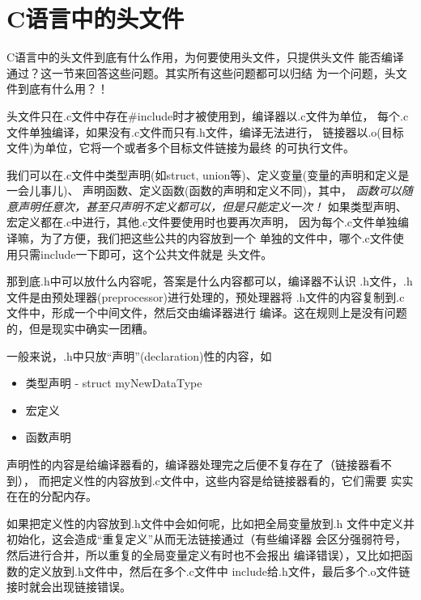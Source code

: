 \section[header file in pure C]{C语言中的头文件}
C语言中的头文件到底有什么作用，为何要使用头文件，只提供头文件
能否编译通过？这一节来回答这些问题。其实所有这些问题都可以归结
为一个问题，头文件到底有什么用？！

头文件只在.c文件中存在\#include时才被使用到，编译器以.c文件为单位，
每个.c文件单独编译，如果没有.c文件而只有.h文件，编译无法进行，
链接器以.o(目标文件)为单位，它将一个或者多个目标文件链接为最终
的可执行文件。

我们可以在.c文件中类型声明(如struct, union等)、定义变量(变量的声明和定义是一会儿事儿)、
声明函数、定义函数(函数的声明和定义不同)，其中，
\emph{函数可以随意声明任意次，甚至只声明不定义都可以，但是只能定义一次！}
如果类型声明、宏定义都在.c中进行，其他.c文件要使用时也要再次声明，
因为每个.c文件单独编译嘛，为了方便，我们把这些公共的内容放到一个
单独的文件中，哪个.c文件使用只需include一下即可，这个公共文件就是
头文件。

那到底.h中可以放什么内容呢，答案是什么内容都可以，编译器不认识
.h文件，.h文件是由预处理器(preprocessor)进行处理的，预处理器将
.h文件的内容复制到.c文件中，形成一个中间文件，然后交由编译器进行
编译。这在规则上是没有问题的，但是现实中确实一团糟。

一般来说，.h中只放“声明”(declaration)性的内容，如
\begin{itemize}
  \item 类型声明 - struct myNewDataType {}
  \item 宏定义
  \item 函数声明
\end{itemize}
声明性的内容是给编译器看的，编译器处理完之后便不复存在了（链接器看不到），
而把定义性的内容放到.c文件中，这些内容是给链接器看的，它们需要
实实在在的分配内存。

如果把定义性的内容放到.h文件中会如何呢，比如把全局变量放到.h
文件中定义并初始化，这会造成“重复定义”从而无法链接通过（有些编译器
会区分强弱符号，然后进行合并，所以重复的全局变量定义有时也不会报出
编译错误），又比如把函数的定义放到.h文件中，然后在多个.c文件中
include给.h文件，最后多个.o文件链接时就会出现链接错误。

